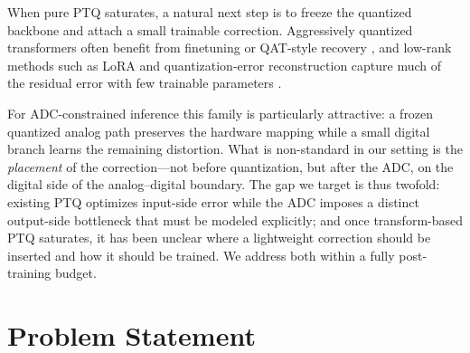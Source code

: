 \documentclass[letterpaper]{article} %
\theoremstyle{plain}
\begin{document}
When pure PTQ saturates, a natural next step is to freeze the quantized backbone and attach a small trainable correction. Aggressively quantized transformers often benefit from finetuning or QAT-style recovery \citep{liu2023llmqat,chen2024efficientqat}, and low-rank methods such as LoRA and quantization-error reconstruction capture much of the residual error with few trainable parameters \citep{hu2022lora,zhang2024lqer}.

For ADC-constrained inference this family is particularly attractive: a frozen quantized analog path preserves the hardware mapping while a small digital branch learns the remaining distortion. What is non-standard in our setting is the \emph{placement} of the correction---not before quantization, but after the ADC, on the digital side of the analog--digital boundary. The gap we target is thus twofold: existing PTQ optimizes input-side error while the ADC imposes a distinct output-side bottleneck that must be modeled explicitly; and once transform-based PTQ saturates, it has been unclear where a lightweight correction should be inserted and how it should be trained. We address both within a fully post-training budget.

\section{Problem Statement}
\end{document}
